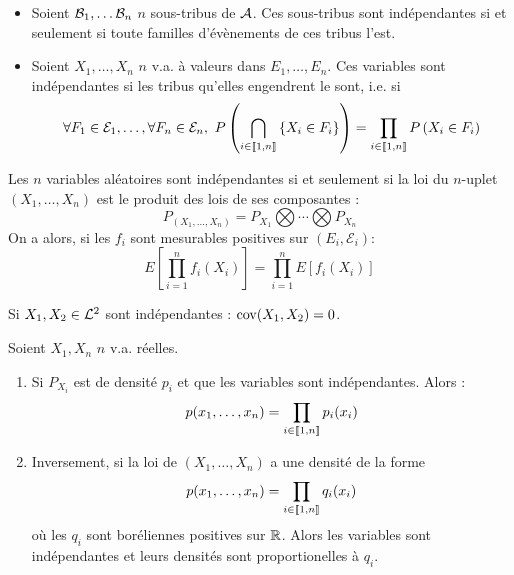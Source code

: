 \documentclass{cours}
\begin{document}
            \begin{definition}
                \begin{itemize}
                    \item Soient $\mathcal{B}_{1}, \ldots \mathcal{B}_{n}$ $n$ sous-tribus de $\mathcal{A}$. Ces sous-tribus sont indépendantes si et seulement si toute familles d'évènements de ces tribus l'est.
                    \item Soient $X_{1}, \ldots, X_{n}$ $n$ v.a. à valeurs dans $E_{1}, \ldots, E_{n}$. Ces variables sont indépendantes si les tribus qu'elles engendrent le sont, i.e. si 
                    \[
                        \forall F_{1} \in \mathcal{E}_{1}, \ldots, \forall F_{n} \in \mathcal{E}_{n}, \ P\left(\bigcap_{i \in \onen{n}}\left\{X_{i} \in F_{i}\right\}\right) = \prod_{i \in \onen{n}} P\left(X_{i} \in F_{i}\right)
                    \]
                \end{itemize}
            \end{definition}

            \begin{theorem}
                Les $n$ variables aléatoires sont indépendantes si et seulement si la loi du $n$-uplet $\left(X_{1}, \ldots, X_{n}\right)$ est le produit des lois de ses composantes : 
                \[
                    P_{\left(X_{1}, \ldots, X_{n}\right)} = P_{X_{1}} \bigotimes \cdots \bigotimes P_{X_{n}}
                \]
                On a alors, si les $f_{i}$ sont mesurables positives sur $\left(E_{i}, \mathcal{E}_{i}\right)$: 
                \[
                    E\left[\prod_{i = 1}^{n}f_{i}(X_{i})\right] = \prod_{i = 1}^{n} E\left[f_{i}(X_{i})\right]
                \]
            \end{theorem}
            \begin{corollary}
                Si $X_{1}, X_{2} \in \mathcal{L}^{2}$ sont indépendantes : $\operatorname{cov}(X_{1}, X_{2}) = 0$.
            \end{corollary}

            \begin{corollary}
                Soient $X_{1}, X_{n}$ $n$ v.a. réelles.
                \begin{enumerate}
                    \item Si $P_{X_{i}}$ est de densité $p_{i}$ et que les variables sont indépendantes. Alors : 
                    \[p(x_{1}, \ldots, x_{n}) = \prod_{i\in \left\llbracket 1, n\right\rrbracket} p_{i}(x_{i})\]
                    \item Inversement, si la loi de $\left(X_{1}, \ldots, X_{n}\right)$ a une densité de la forme \[p(x_{1}, \ldots, x_{n}) = \prod_{i\in \left\llbracket 1, n\right\rrbracket} q_{i}(x_{i})\] où les $q_{i}$ sont boréliennes positives sur $\mathbb{R}$. Alors les variables sont indépendantes et leurs densités sont proportionelles à $q_{i}$.
                \end{enumerate}
            \end{corollary}
\end{document}
